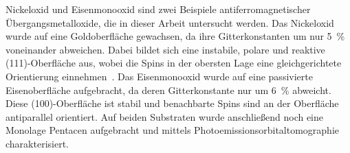     Nickeloxid und Eisenmonooxid sind zwei Beispiele antiferromagnetischer Übergangsmetalloxide, die in dieser Arbeit untersucht werden.
    Das Nickeloxid wurde auf eine Goldoberfläche gewachsen, da ihre Gitterkonstanten um nur \SI{5}{\percent} voneinander abweichen.
    Dabei bildet sich eine instabile, polare und reaktive (111)-Oberfläche aus, wobei die Spins in der obersten Lage eine gleichgerichtete Orientierung einnehmen~\cite{cappus_hydroxyl_1993}.
    Das Eisenmonooxid wurde auf eine passivierte Eisenoberfläche aufgebracht, da deren Gitterkonstante nur um \SI{6}{\percent} abweicht.
    Diese (100)-Oberfläche ist stabil und benachbarte Spins sind an der Oberfläche antiparallel orientiert.
    Auf beiden Substraten wurde anschließend noch eine Monolage Pentacen aufgebracht und mittels Photoemissionsorbitaltomographie charakterisiert.
    


